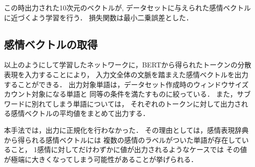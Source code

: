 			この時出力された10次元のベクトルが,
			データセットに与えられた感情ベクトルに近づくよう学習を行う．
			損失関数は最小二乗誤差とした．

		\subsection{感情ベクトルの取得}
			以上のようにして学習したネットワークに，BERTから得られたトークンの分散表現を入力することにより，
			入力文全体の文脈を踏まえた感情ベクトルを出力することができる．
			出力対象単語は，データセット作成時のウィンドウサイズカウント対象になる単語と
			同等の条件を満たすものに絞っている．
			また，サブワードに別れてしまう単語については，
			それぞれのトークンに対して出力される感情ベクトルの平均値をまとめて出力する．

			本手法では，出力に正規化を行わなかった．
			その理由としては，感情表現辞典から得られる感情ベクトルには
			複数の感情のラベルがついた単語が存在していること，
			1感情に対してだけわずかに値が出力されるようなケースでは
			その値が極端に大きくなってしまう可能性があることが挙げられる．

